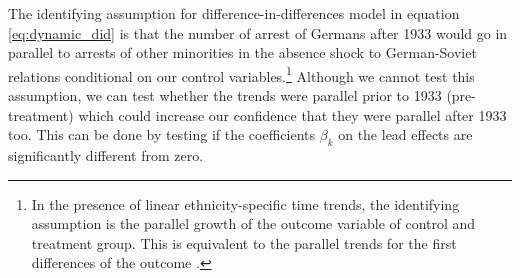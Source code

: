 

The identifying assumption for difference-in-differences model in equation \ref{eq:dynamic_did} is that the number of arrest of Germans after 1933 would go in parallel to arrests of other minorities in the absence shock to German-Soviet relations conditional on our control variables.\footnote{In the presence of linear ethnicity-specific time trends, the identifying assumption  is the parallel growth of the outcome variable of control and treatment group. This is equivalent to the parallel trends for the first differences of the outcome \citep{mora_alternative_2019}. } Although we cannot test this assumption, we can test whether the trends were parallel prior to 1933 (pre-treatment) which could increase our confidence that they were parallel after 1933 too. This can be done by testing if the coefficients $\beta_k$ on the lead effects are significantly different from zero.  

